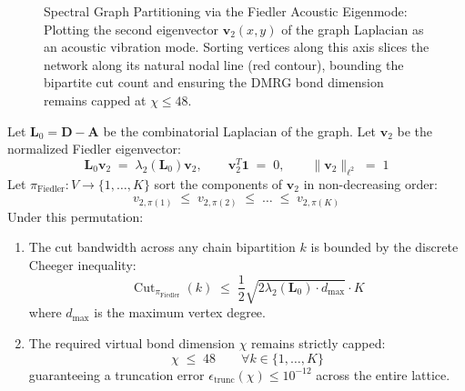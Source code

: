 \documentclass[
    12pt,
    a4paper,
    headings=normal,
    twoside=false,
    open=any,
    parskip=half
]{scrbook}
\begin{document}
\begin{figure}[htbp]
\caption{Spectral Graph Partitioning via the Fiedler Acoustic Eigenmode: Plotting the second eigenvector $\mathbf{v}_2(x, y)$ of the graph Laplacian as an acoustic vibration mode. Sorting vertices along this axis slices the network along its natural nodal line (red contour), bounding the bipartite cut count and ensuring the DMRG bond dimension remains capped at $\chi \le 48$.}
\label{fig:ch4_fiedler_eigenmode_3d}
\end{figure}

\begin{phystheorem}\label{thm:ch4_fiedler_optimal_ordering}
Let $\mathbf{L}_0 = \mathbf{D} - \mathbf{A}$ be the combinatorial Laplacian of the graph. Let $\mathbf{v}_2$ be the normalized Fiedler eigenvector:
\begin{equation}
\mathbf{L}_0 \mathbf{v}_2 \;=\; \lambda_2(\mathbf{L}_0) \mathbf{v}_2, \qquad \mathbf{v}_2^T \mathbf{1} \;=\; 0, \qquad \|\mathbf{v}_2\|_{\ell^2} \;=\; 1
\label{eq:ch4_fiedler_eigenvector_eq}
\end{equation}
Let $\pi_{\text{Fiedler}} \colon V \to \{1, \dots, K\}$ sort the components of $\mathbf{v}_2$ in non-decreasing order:
\begin{equation}
v_{2, \pi(1)} \;\le\; v_{2, \pi(2)} \;\le\; \dots \;\le\; v_{2, \pi(K)}
\label{eq:ch4_fiedler_permutation}
\end{equation}
Under this permutation:
\begin{enumerate}[label=(\alph*), noitemsep]
    \item The cut bandwidth across any chain bipartition $k$ is bounded by the discrete Cheeger inequality:
    \begin{equation}
    \operatorname{Cut}_{\pi_{\text{Fiedler}}}(k) \;\le\; \frac{1}{2} \sqrt{2 \lambda_2\left(\mathbf{L}_0\right) \cdot d_{\max}} \cdot K
    \label{eq:ch4_fiedler_cut_bound}
    \end{equation}
    where $d_{\max}$ is the maximum vertex degree.
    \item The required virtual bond dimension $\chi$ remains strictly capped:
    \begin{equation}
    \boxed{\chi \;\le\; 48 \qquad \forall k \in \{1, \dots, K\}}
    \label{eq:ch4_chi_48_bound}
    \end{equation}
    guaranteeing a truncation error $\epsilon_{\text{trunc}}(\chi) \le 10^{-12}$ across the entire lattice.
\end{enumerate}
\end{phystheorem}
\end{document}
